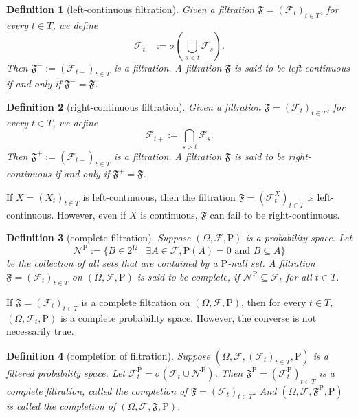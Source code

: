 \documentclass{report}
\newtheorem{definition}{Definition}[section]
\theoremstyle{nonumberplain}
\begin{document}
\begin{definition}[left-continuous filtration]
	Given a filtration $\mathfrak{F}=(\mathcal{F}_{t})_{t\in T}$, for every $t\in T$, we define
	\[
	\mathcal{F}_{t-}:=\sigma\left(\bigcup_{s<t}\mathcal{F}_{s}\right).
	\]
	Then $\mathfrak{F}^-:=({\mathcal{F}}_{t-})_{t\in T}$ is a filtration. A filtration $\mathfrak{F}$ is said to be \emph{left-continuous} if and only if $\mathfrak{F}^{-}=\mathfrak{F}$.
\end{definition}
\begin{definition}[right-continuous filtration]
	Given a filtration $\mathfrak{F}=(\mathcal{F}_{t})_{t\in T}$, for every $t\in T$, we define
	\[
	\mathcal{F}_{t+}:=\bigcap_{s>t}\mathcal{F}_{s}.
	\]
	Then $\mathfrak{F}^+:=({\mathcal{F}}_{t+})_{t\in T}$ is a filtration. A filtration $\mathfrak{F}$ is said to be \emph{right-continuous} if and only if $\mathfrak{F}^{+}=\mathfrak{F}$.
\end{definition}
If $X=(X_t)_{t\in T}$ is left-continuous, then the filtration $\mathfrak{F}=\left(\mathcal{F}_t^X\right)_{t\in T}$ is left-continuous. However, even if $X$ is continuous, $\mathfrak{F}$ can fail to be right-continuous.
\begin{definition}[complete filtration]
	Suppose $(\Omega,\mathcal{F},\mathrm{P})$ is a probability space. Let
	\[
		\mathcal{N}^{\mathrm{P}}:=\{B\in 2^\Omega \mid \exists A\in\mathcal{F},\mathrm{P}(A)=0\text{ and }B\subseteq A\}
	\]
	be the collection of all sets that are contained by a $\mathrm{P}$-null set. A filtration $\mathfrak{F} =(\mathcal{F}_{t})_{t\in T}$ on $(\Omega,\mathcal{F},\mathrm{P})$ is said to be \emph{complete}, if $\mathcal{N}^{\mathrm{P}}\subseteq\mathcal{F}_t$ for all $t\in T$. 
\end{definition}
If $\mathfrak{F} =(\mathcal{F}_{t})_{t\in T}$ is a complete filtration on $(\Omega,\mathcal{F},\mathrm{P})$, then for every $t\in T$, $(\Omega,\mathcal{F}_t,\mathrm{P})$ is a complete probability space. However, the converse is not necessarily true.
\begin{definition}[completion of filtration]
	Suppose $(\Omega,\mathcal{F},(\mathcal{F}_{t})_{t\in T }, \mathrm{P})$ is a filtered probability space. Let $\mathcal{F}_{t}^{\mathrm{P}}=\sigma\left(\mathcal{F}_{t} \cup \mathcal{N}^{\mathrm{P}}\right)$. Then $\mathfrak{F}^{\mathrm{P}} =(\mathcal{F}_{t}^{\mathrm{P}})_{t\in T}$ is a complete filtration, called the \emph{completion} of $\mathfrak{F} =(\mathcal{F}_{t})_{t\in T}$. And $(\Omega,\mathcal{F},\mathfrak{F}^{\mathrm{P}}, \mathrm{P})$ is called the \emph{completion} of $(\Omega,\mathcal{F},\mathfrak{F}, \mathrm{P})$.
\end{definition}
\end{document}
